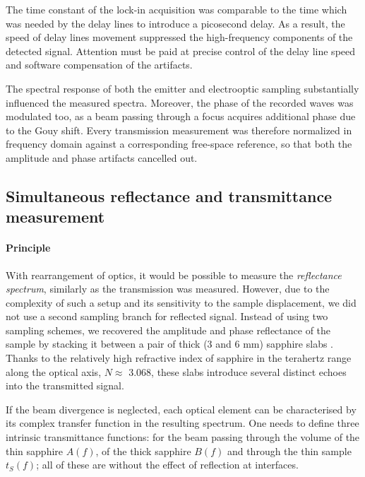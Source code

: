 The time constant of the lock-in acquisition was comparable to the time which was needed by the delay lines to introduce a picosecond delay. As a result, the speed of delay lines movement suppressed the high-frequency components of the detected signal. Attention must be paid at precise control of the delay line speed and software compensation of the artifacts.

The spectral response of both the emitter and electrooptic sampling substantially influenced the measured spectra. Moreover, the phase of the recorded waves was modulated too, as a beam passing through a focus acquires additional phase due to the Gouy shift. Every transmission measurement was therefore normalized in frequency domain against a corresponding free-space reference, so that both the amplitude and phase artifacts cancelled out. 


\subsection{Simultaneous reflectance and transmittance measurement}
\paragraph{Principle} %
\label{srtm}
With rearrangement of optics, it would be possible to measure the \textit{reflectance spectrum}, similarly as the transmission was measured. However, due to the complexity of such a setup and its sensitivity to the sample displacement, we did not use a second sampling branch for reflected signal. Instead of using two sampling schemes, we recovered the amplitude and phase reflectance of the sample by stacking it between a pair of thick (3 and 6 mm) sapphire slabs \cite{nemec2012resonant}. Thanks to the relatively high refractive index of sapphire in the terahertz range along the optical axis, $N \approx$ 3.068, these slabs introduce several distinct echoes into the transmitted signal.

If the beam divergence is neglected, each optical element can be characterised by its complex transfer function in the resulting spectrum. One needs to define three intrinsic transmittance functions: for the beam passing through the volume of the thin sapphire $A(f)$, of the thick sapphire $B(f)$ and through the thin sample $t_S(f)$; all of these are without the effect of reflection at interfaces. 

